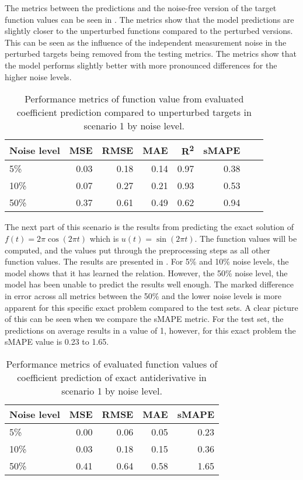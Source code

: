 \documentclass[preprint,12pt,times,authoryear]{elsarticle}
\begin{document}
The metrics between the predictions and the noise-free version of the target function values can be seen in . The metrics show that the model predictions are slightly closer to the unperturbed functions compared to the perturbed versions. This can be seen as the influence of the independent measurement noise in the perturbed targets being removed from the testing metrics. The metrics show that the model performs slightly better with more pronounced differences for the higher noise levels.
\begin{table}[H]
  \caption{Performance metrics of function value from evaluated coefficient prediction compared to unperturbed targets in scenario 1 by noise level.}\label{table:scenario_1_clean_function_metrics}
  \centering
  \begin{tabular}{lrrrrrrr}
    \toprule
    Noise level & MSE  & RMSE & MAE  & R\textsuperscript{2} & sMAPE \\
    \midrule
    5\%         & 0.03 & 0.18 & 0.14 & 0.97                 & 0.38  \\
    10\%        & 0.07 & 0.27 & 0.21 & 0.93                 & 0.53  \\
    50\%        & 0.37 & 0.61 & 0.49 & 0.62                 & 0.94  \\
    \bottomrule
  \end{tabular}
\end{table}

The next part of this scenario is the results from predicting the exact solution of \(f(t)=2\pi\cos(2\pi t)\) which is \(u(t)=\sin(2\pi t)\). The function values will be computed, and the values put through the preprocessing steps as all other function values. The results are presented in . For 5\% and 10\% noise levels, the model shows that it has learned the relation. However, the 50\% noise level, the model has been unable to predict the results well enough. The marked difference in error across all metrics between the 50\% and the lower noise levels is more apparent for this specific exact problem compared to the test sets. A clear picture of this can be seen when we compare the sMAPE metric. For the test set, the predictions on average results in a value of 1, however, for this exact problem the sMAPE value is 0.23 to 1.65.
\begin{table}[H]
  \caption{Performance metrics of evaluated function values of coefficient prediction of exact antiderivative in scenario 1 by noise level.}\label{table:scenario_1_exact_function_metrics}
  \centering
  \begin{tabular}{lrrrr}
    \toprule
    Noise level & MSE  & RMSE & MAE  & sMAPE \\
    \midrule
    5\%         & 0.00 & 0.06 & 0.05 & 0.23  \\
    10\%        & 0.03 & 0.18 & 0.15 & 0.36  \\
    50\%        & 0.41 & 0.64 & 0.58 & 1.65  \\
    \bottomrule
  \end{tabular}
\end{table}
\end{document}
